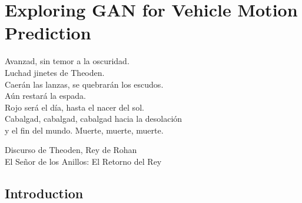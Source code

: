 % 
% 
% 
% 
% 
% 
% 

\chapter{Exploring GAN for Vehicle Motion Prediction}
\label{cha:exploring_gan_for_vehicle_mp}

\begin{FraseCelebre}
	\begin{Frase}
		Avanzad, sin temor a la oscuridad. \\
		Luchad jinetes de Theoden. \\
		Caerán las lanzas, se quebrarán los escudos. \\
		Aún restará la espada. \\
		Rojo será el día, hasta el nacer del sol. \\
		Cabalgad, cabalgad, cabalgad hacia la desolación \\ 
		y el fin del mundo. Muerte, muerte, muerte.
	\end{Frase}
	\begin{Fuente}
		Discurso de Theoden, Rey de Rohan \\
		El Señor de los Anillos: El Retorno del Rey
	\end{Fuente}
\end{FraseCelebre}

\section{Introduction}
\label{sec:5_introduction}

